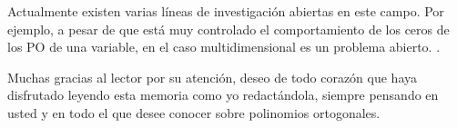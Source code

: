 Actualmente existen varias líneas de investigación abiertas en este campo. Por ejemplo, a pesar de que está muy controlado el comportamiento de los ceros de los PO de una variable, en el caso multidimensional es un problema abierto. .

Muchas gracias al lector por su atención, deseo de todo corazón que haya disfrutado leyendo esta memoria como yo redactándola, siempre pensando en usted y en todo el que desee conocer sobre polinomios ortogonales.


\begin{comment}
    En general: F. Marcellán, Arno Kuijlaars, Andrei Martínez, Yuan Xu, Kerstin Jordaan, Ismail, Walter van Assche
    Relación con procesos de Markov: Manuel Domínguez, Grumbaum F. Alberto, Luis Velázquez.
    
    Problemas abiertos:
    - Cadenas de Markov y polinomios en varias variables
    - Ortogonalidad múltiple en varias variables 
    - Relación entre los ceros en varias variables y el problema número 7 de Smale: distribución de puntos en la esfera que minimicen la energía logarítmica  (Carlos Beltrán)  
\end{comment}